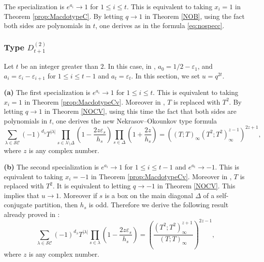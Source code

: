 \documentclass[11pt,letterpaper]{amsart}
\def\ccsc{\mathcal {SC}}
\def\ccdd{\mathcal {DD}}
\numberwithin{equation}{section}
\numberwithin{df}{section}
\begin{document}
The specialization  is $e^{a_i}\to 1$ for $1\leq i\leq t$. This is equivalent to taking $x_i=1$ in Theorem \ref{prop:MacdotypeC}. By letting $q\rightarrow 1$ in Theorem \ref{NOB}, using the fact both sides are polynomials in $t$, one derives as in \cite[Theorem $3.1$]{MP} the formula \eqref{eq:nospecc}.
%

\subsubsection{Type $D^{(2)}_{t+1}$}
Let $t$ be an integer greater than $2$.
In this case, in \cite{Mac}, $a_0=1/2-\varepsilon_1$, and $a_i=\varepsilon_i-\varepsilon_{i+1}$ for $1\leq i\leq t-1$ and $a_t=\varepsilon_t$. In this section, we set $u=q^{2t}$.


\textbf{(a)} The first specialization is $e^{a_i}\to 1$ for $1\leq i\leq t$. This is equivalent to taking $x_i=1$ in Theorem \ref{prop:MacdotypeCv}. Moreover in \cite[Appendix $1$]{Mac}, $T$ is replaced with $T^2$. By letting $q\rightarrow 1$ in Theorem \ref{NOCV}, using this time the fact that both sides are polynomials in $t$, one derives the new Nekrasov--Okounkov type formula
\begin{equation}\label{eq:nospeccv}
\sum_{\lambda\in\ccsc}(-1)^{d_\lambda}T^{\lvert \lambda\rvert}\prod_{s\in\lambda\setminus\Delta}\left(1-\frac{2z\varepsilon_s}{h_s}\right)\prod_{s\in\Delta}\left(1+\frac{2z}{h_s}\right)=\left(\left(T;T\right)_{\infty}\left(T^2;T^2\right)_{\infty}^{z-1}\right)^{2z+1},
\end{equation}
where $z$ is any complex number.

\textbf{(b)} The second specialization is $e^{a_i}\to 1$ for $1\leq i\leq t-1$ and $e^{a_t}\to -1$.
 This is equivalent to taking $x_i=-1$ in Theorem \ref{prop:MacdotypeCv}. Moreover in \cite[Appendix $1$]{Mac}, $T$ is replaced with $T^2$. It is equivalent to letting $q\to -1$ in Theorem \ref{NOCV}. This implies that $u\to 1$. Moreover if $s$ is a box on the main diagonal $\Delta$ of a self-conjugate partition, then $h_s$ is odd. Therefore we derive the following result already proved in \cite[Theorem $3.24$]{MP}:
 \begin{equation}\label{eq:nospeccvmoins1}
\sum_{\lambda\in\ccsc}(-1)^{d_\lambda}T^{\lvert \lambda\rvert}\prod_{s\in\lambda}\left(1-\frac{2z\varepsilon_s}{h_s}\right)=\left(\frac{\left(T^2;T^2\right)_{\infty}^{z+1}}{\left(T;T\right)_{\infty}}\right)^{2z-1},
\end{equation}
where $z$ is any complex number.
\end{document}
